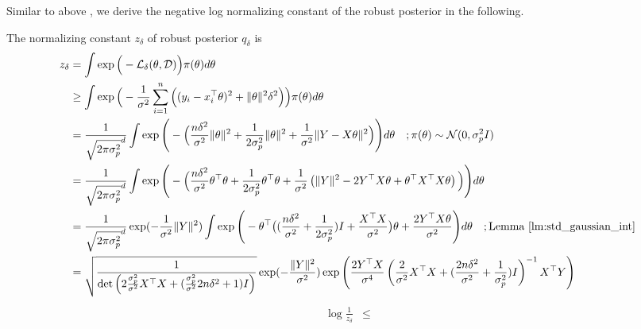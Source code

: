 Similar to above , we derive the negative log normalizing constant of the robust posterior in the following.

\begin{lemma}
The normalizing constant $z_\delta$ of robust posterior $q_\delta$ is
\begin{align*}
    z_\delta &= \int \exp\Big( -\mathcal{L}_\delta(\theta, \mathcal{D}) \Big) \pi(\theta) d\theta \\
    &\geq \int \exp\Big( -{\frac{1}{\sigma^2}} \sum_{i=1}^n \Big( (y_i - x_i^\top \theta)^2 + \Vert \theta \Vert^2 \delta^2 \Big) \Big) \pi(\theta) d\theta \\
    &= \frac{1}{\sqrt{2\pi\sigma^2_p}^d}\int \exp\Bigg( - \Big( \frac{n \delta^2}{{\sigma^2}}\Vert \theta \Vert^2  + \frac{1}{2\sigma^2_p}\Vert \theta \Vert^2 + \frac{1}{{\sigma^2}} \Vert Y - X\theta \Vert^2  \Big) \Bigg)  d\theta  \quad; \pi(\theta) \sim \mathcal{N}(0,\sigma^2_p I)\\
    &= \frac{1}{\sqrt{2\pi\sigma^2_p}^d}\int \exp\Bigg( - \Big( \frac{ n\delta^2}{{\sigma^2}} \theta^\top \theta  + \frac{1}{2\sigma^2_p}\theta^\top \theta + {\frac{1}{\sigma^2}}\lp \Vert Y \Vert^2 - 2 Y^\top X \theta + \theta^\top X^\top X \theta \rp \Big) \Bigg)  d\theta  \\
    &= \frac{1}{\sqrt{2\pi\sigma^2_p}^d} \exp(-\frac{1}{\sigma^2}\Vert Y\Vert^2) \int \exp\Bigg( - \theta^\top \big( (\frac{n\delta^2}{{\sigma^2}} + \frac{1}{2\sigma^2_p})I + \frac{X^\top X}{{\sigma^2}}  \big)\theta + \frac{2 Y^\top X\theta}{{\sigma^2}} \Bigg)  d\theta \quad; \text{Lemma \ref{lm:std_gaussian_int}}  \\
    &=  \sqrt{\frac{1}{\det \lp 2{\frac{\sigma_p^2}{\sigma^2}}X^\top X + ({\frac{\sigma_p^2}{\sigma^2}}2 n\delta^2 + 1)I\rp}} \exp(-\frac{\Vert Y\Vert^2}{{\sigma^2}}) \exp\lp \frac{2Y^\top X}{{\sigma^4}} \lp {\frac{2}{\sigma^2}}X^\top X + ({\frac{2 n\delta^2}{\sigma^2}} + \frac{1}{\sigma^2_p})I\rp^{-1}X^\top Y\rp %
\end{align*}
\begin{align*}
    \log \frac{1}{z_\delta}&\leq  %

\end{align*}
\end{lemma}
